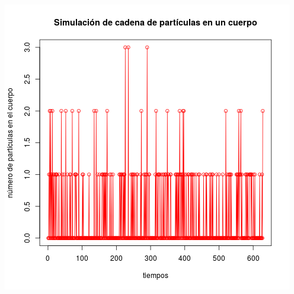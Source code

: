 \documentclass[paper=letter, fontsize=12pt]{scrartcl} %
\numberwithin{equation}{section} %
\numberwithin{figure}{section} %
\numberwithin{table}{section} %
\begin{document}
\includegraphics[scale=0.5]{ej3_1.png}
\end{document}
